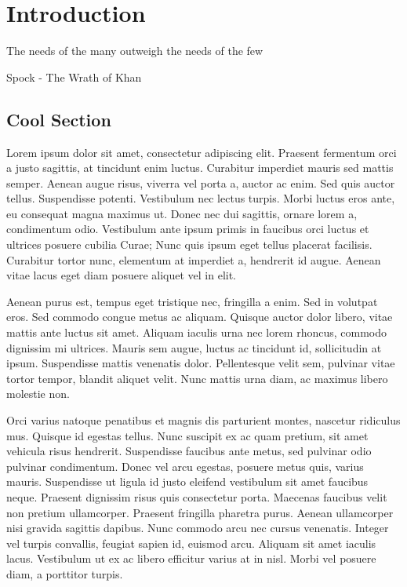 \chapter{Introduction}

\begin{FraseCelebre}
  \begin{Frase}
    The needs of the many outweigh the needs of the few
  \end{Frase}
  \begin{Fuente}
    Spock - The Wrath of Khan
  \end{Fuente}
\end{FraseCelebre}

\section{Cool Section}

Lorem ipsum dolor sit amet, consectetur adipiscing elit. Praesent fermentum orci
a justo sagittis, at tincidunt enim luctus. Curabitur imperdiet mauris sed
mattis semper. Aenean augue risus, viverra vel porta a, auctor ac enim. Sed quis
auctor tellus. Suspendisse potenti. Vestibulum nec lectus turpis. Morbi luctus
eros ante, eu consequat magna maximus ut. Donec nec dui sagittis, ornare lorem
a, condimentum odio. Vestibulum ante ipsum primis in faucibus orci luctus et
ultrices posuere cubilia Curae; Nunc quis ipsum eget tellus placerat facilisis.
Curabitur tortor nunc, elementum at imperdiet a, hendrerit id augue. Aenean
vitae lacus eget diam posuere aliquet vel in elit.

Aenean purus est, tempus eget tristique nec, fringilla a enim. Sed in volutpat
eros. Sed commodo congue metus ac aliquam. Quisque auctor dolor libero, vitae
mattis ante luctus sit amet. Aliquam iaculis urna nec lorem rhoncus, commodo
dignissim mi ultrices. Mauris sem augue, luctus ac tincidunt id, sollicitudin at
ipsum. Suspendisse mattis venenatis dolor. Pellentesque velit sem, pulvinar
vitae tortor tempor, blandit aliquet velit. Nunc mattis urna diam, ac maximus
libero molestie non.

Orci varius natoque penatibus et magnis dis parturient montes, nascetur
ridiculus mus. Quisque id egestas tellus. Nunc suscipit ex ac quam pretium, sit
amet vehicula risus hendrerit. Suspendisse faucibus ante metus, sed pulvinar
odio pulvinar condimentum. Donec vel arcu egestas, posuere metus quis, varius
mauris. Suspendisse ut ligula id justo eleifend vestibulum sit amet faucibus
neque. Praesent dignissim risus quis consectetur porta. Maecenas faucibus velit
non pretium ullamcorper. Praesent fringilla pharetra purus. Aenean ullamcorper
nisi gravida sagittis dapibus. Nunc commodo arcu nec cursus venenatis. Integer
vel turpis convallis, feugiat sapien id, euismod arcu. Aliquam sit amet iaculis
lacus. Vestibulum ut ex ac libero efficitur varius at in nisl. Morbi vel posuere
diam, a porttitor turpis.

